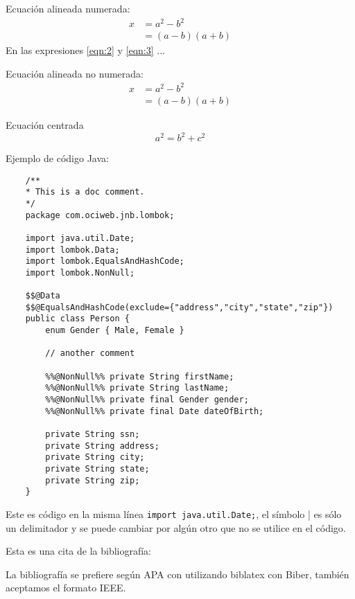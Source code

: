 \documentclass[fleqn]{Paquetes/RevDigMatEduInt}
\begin{document}
Ecuación alineada numerada:
\begin{align}
	x & = a^2-b^2 \label{eqn:2}\\
	& = (a-b)(a+b) \label{eqn:3}
\end{align}
En las expresiones \ref{eqn:2} y \ref{eqn:3} ...

Ecuación alineada no numerada:
\begin{align*}
	x & = a^2-b^2 \\
	& = (a-b)(a+b)
\end{align*}

Ecuación centrada \[ a^2=b^2+c^2 \]


Ejemplo de código Java:

\begin{lstlisting}
	/**
	* This is a doc comment.
	*/
	package com.ociweb.jnb.lombok;
	
	import java.util.Date;
	import lombok.Data;
	import lombok.EqualsAndHashCode;
	import lombok.NonNull;
	
	$$@Data
	$$@EqualsAndHashCode(exclude={"address","city","state","zip"})
	public class Person {
		enum Gender { Male, Female }
		
		// another comment
		
		%%@NonNull%% private String firstName;
		%%@NonNull%% private String lastName;
		%%@NonNull%% private final Gender gender;
		%%@NonNull%% private final Date dateOfBirth;
		
		private String ssn;
		private String address;
		private String city;
		private String state;
		private String zip;
	}
\end{lstlisting}

Este es código en la misma línea \lstinline|import java.util.Date;|, el símbolo | es sólo un delimitador y se puede cambiar por algún otro que no se utilice en el código.



Esta es una cita de la bibliografía: \cite{H}

La bibliografía se prefiere según APA con utilizando biblatex con Biber, también aceptamos el formato IEEE.
\end{document}
